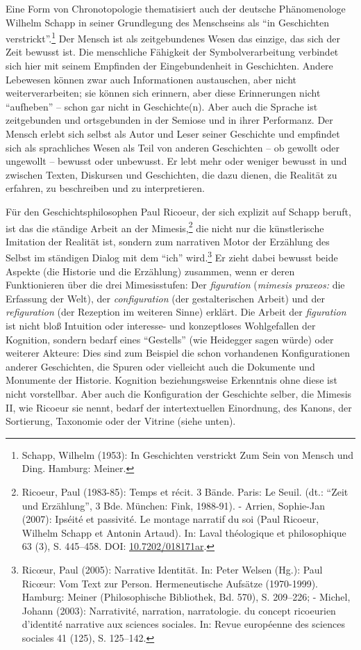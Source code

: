 Eine Form von Chronotopologie thematisiert auch der deutsche
Phänomenologe Wilhelm Schapp in seiner Grundlegung des Menschseins als
\enquote{in Geschichten verstrickt}.\footnote{Schapp, Wilhelm (1953): In
  Geschichten verstrickt Zum Sein von Mensch und Ding. Hamburg: Meiner.}
Der Mensch ist als zeitgebundenes Wesen das einzige, das sich der Zeit
bewusst ist. Die menschliche Fähigkeit der Symbolverarbeitung verbindet
sich hier mit seinem Empfinden der Eingebundenheit in Geschichten.
Andere Lebewesen können zwar auch Informationen austauschen, aber nicht
weiterverarbeiten; sie können sich erinnern, aber diese Erinnerungen
nicht \enquote{aufheben} -- schon gar nicht in Geschichte(n). Aber auch
die Sprache ist zeitgebunden und ortsgebunden in der Semiose und in
ihrer Performanz. Der Mensch erlebt sich selbst als Autor und Leser
seiner Geschichte und empfindet sich als sprachliches Wesen als Teil von
anderen Geschichten -- ob gewollt oder ungewollt -- bewusst oder
unbewusst. Er lebt mehr oder weniger bewusst in und zwischen Texten,
Diskursen und Geschichten, die dazu dienen, die Realität zu erfahren, zu
beschreiben und zu interpretieren.

Für den Geschichtsphilosophen Paul Ricoeur, der sich explizit auf Schapp
beruft, ist das die ständige Arbeit an der Mimesis,\footnote{Ricoeur,
  Paul (1983-85): Temps et récit. 3 Bände. Paris: Le Seuil. (dt.:
  \enquote{Zeit und Erzählung}, 3 Bde. München: Fink, 1988-91). -
  Arrien, Sophie-Jan (2007): Ipséité et passivité. Le montage narratif
  du soi (Paul Ricoeur, Wilhelm Schapp et Antonin Artaud). In: Laval
  théologique et philosophique 63 (3), S. 445--458. DOI:
  \href{http://doi.org/10.7202/018171ar}{10.7202/018171ar}.} die nicht
nur die künstlerische Imitation der Realität ist, sondern zum narrativen
Motor der Erzählung des Selbst im ständigen Dialog mit dem \enquote{ich}
wird.\footnote{Ricœur, Paul (2005): Narrative Identität. In: Peter
  Welsen (Hg.): Paul Ricœur: Vom Text zur Person. Hermeneutische
  Aufsätze (1970-1999). Hamburg: Meiner (Philosophische Bibliothek, Bd.
  570), S. 209--226; - Michel, Johann (2003): Narrativité, narration,
  narratologie. du concept ricoeurien d'identité narrative aux sciences
  sociales. In: Revue européenne des sciences sociales 41 (125), S.
  125--142.} Er zieht dabei bewusst beide Aspekte (die Historie und die
Erzählung) zusammen, wenn er deren Funktionieren über die drei
Mimesisstufen: Der \emph{figuration} (\emph{mimesis praxeos:} die
Erfassung der Welt), der \emph{configuration} (der gestalterischen
Arbeit) und der \emph{refiguration} (der Rezeption im weiteren Sinne)
erklärt. Die Arbeit der \emph{figuration} ist nicht bloß Intuition oder
interesse- und konzeptloses Wohlgefallen der Kognition, sondern bedarf
eines \enquote{Gestells} (wie Heidegger sagen würde) oder weiterer
Akteure: Dies sind zum Beispiel die schon vorhandenen Konfigurationen
anderer Geschichten, die Spuren oder vielleicht auch die Dokumente und
Monumente der Historie. Kognition beziehungsweise Erkenntnis ohne diese
ist nicht vorstellbar. Aber auch die Konfiguration der Geschichte
selber, die Mimesis II, wie Ricoeur sie nennt, bedarf der
intertextuellen Einordnung, des Kanons, der Sortierung, Taxonomie oder
der Vitrine (siehe unten).

